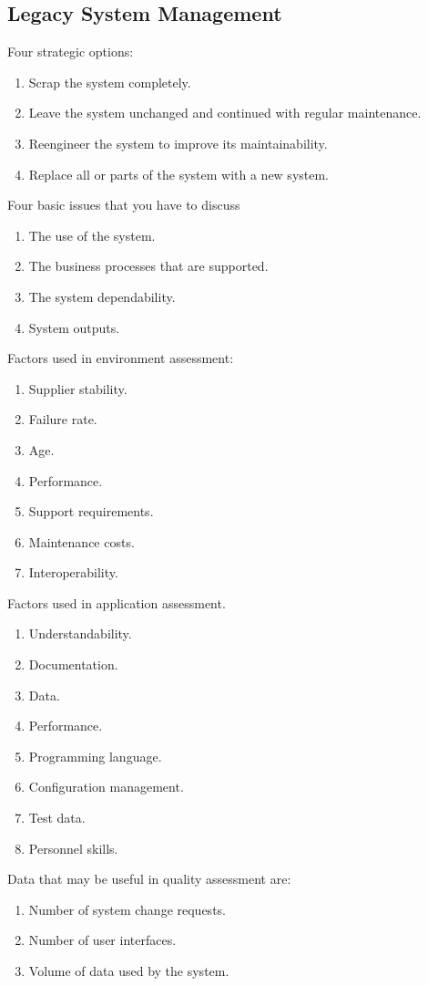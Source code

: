\documentclass{article}
\begin{document}
\subsection{Legacy System Management}
Four strategic options:
\begin{enumerate}
    \item Scrap the system completely.
    \item Leave the system unchanged and continued with regular maintenance.
    \item Reengineer the system to improve its maintainability.
    \item Replace all or parts of the system with a new system.
\end{enumerate}

Four basic issues that you have to discuss
\begin{enumerate}
    \item The use of the system.
    \item The business processes that are supported.
    \item The system dependability.
    \item System outputs.
\end{enumerate}
 Factors used in environment assessment:
\begin{enumerate}
    \item Supplier stability.
    \item Failure rate.
    \item Age.
    \item Performance.
    \item Support requirements.
    \item Maintenance costs.
    \item Interoperability.
\end{enumerate}

Factors used in application assessment.
\begin{enumerate}
    \item Understandability.
    \item Documentation.
    \item Data.
    \item Performance.
    \item Programming language.
    \item Configuration management.
    \item Test data.
    \item Personnel skills.
\end{enumerate}

Data that may be useful in quality assessment are:
\begin{enumerate}
    \item Number of system change requests.
    \item Number of user interfaces.
    \item Volume of data used by the system.
\end{enumerate}
\end{document}
